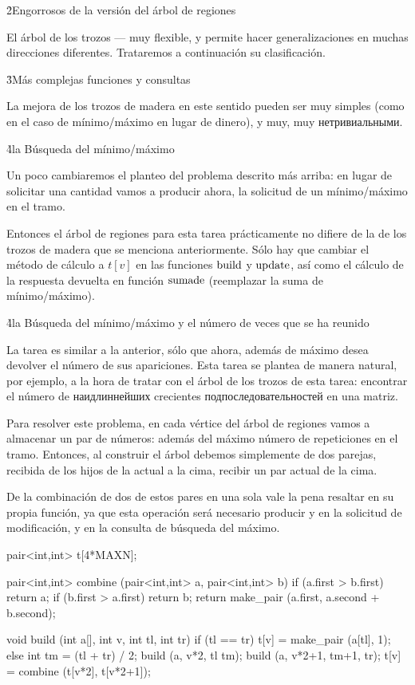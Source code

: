 \h2{Engorrosos de la versión del árbol de regiones}

El árbol de los trozos --- muy flexible, y permite hacer generalizaciones en muchas direcciones diferentes. Trataremos a continuación su clasificación.


\h3{Más complejas funciones y consultas}

La mejora de los trozos de madera en este sentido pueden ser muy simples (como en el caso de mínimo/máximo en lugar de dinero), y muy, muy нетривиальными.

\h4{la Búsqueda del mínimo/máximo}

Un poco cambiaremos el planteo del problema descrito más arriba: en lugar de solicitar una cantidad vamos a producir ahora, la solicitud de un mínimo/máximo en el tramo.

Entonces el árbol de regiones para esta tarea prácticamente no difiere de la de los trozos de madera que se menciona anteriormente. Sólo hay que cambiar el método de cálculo a $t[v]$ en las funciones $\rm build$ y $\rm update$, así como el cálculo de la respuesta devuelta en función $\rm suma de$ (reemplazar la suma de mínimo/máximo).

\h4{la Búsqueda del mínimo/máximo y el número de veces que se ha reunido}

La tarea es similar a la anterior, sólo que ahora, además de máximo desea devolver el número de sus apariciones. Esta tarea se plantea de manera natural, por ejemplo, a la hora de tratar con el árbol de los trozos de esta tarea: encontrar el número de наидлиннейших crecientes подпоследовательностей en una matriz.

Para resolver este problema, en cada vértice del árbol de regiones vamos a almacenar un par de números: además del máximo número de repeticiones en el tramo. Entonces, al construir el árbol debemos simplemente de dos parejas, recibida de los hijos de la actual a la cima, recibir un par actual de la cima.

De la combinación de dos de estos pares en una sola vale la pena resaltar en su propia función, ya que esta operación será necesario producir y en la solicitud de modificación, y en la consulta de búsqueda del máximo.

\code
pair<int,int> t[4*MAXN];

pair<int,int> combine (pair<int,int> a, pair<int,int> b) {
if (a.first > b.first)
return a;
if (b.first > a.first)
return b;
return make_pair (a.first, a.second + b.second);
}

void build (int a[], int v, int tl, int tr) {
if (tl == tr)
t[v] = make_pair (a[tl], 1);
else {
int tm = (tl + tr) / 2;
build (a, v*2, tl tm);
build (a, v*2+1, tm+1, tr);
t[v] = combine (t[v*2], t[v*2+1]);
}
}

